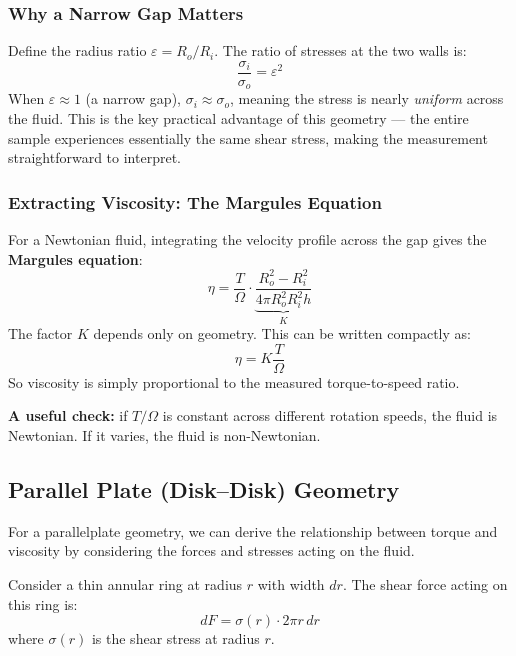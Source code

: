 \subsubsection{Why a Narrow Gap Matters}

Define the radius ratio $\varepsilon = R_o/R_i$. The ratio of stresses at the two 
walls is:
\begin{equation}
    \frac{\sigma_i}{\sigma_o} = \varepsilon^2
\end{equation}
When $\varepsilon \approx 1$ (a narrow gap), $\sigma_i \approx \sigma_o$, meaning 
the stress is nearly \emph{uniform} across the fluid. This is the key practical 
advantage of this geometry --- the entire sample experiences essentially the same 
shear stress, making the measurement straightforward to interpret.

\subsubsection{Extracting Viscosity: The Margules Equation}

For a Newtonian fluid, integrating the velocity profile across the gap gives the 
\textbf{Margules equation}:
\begin{equation}
    \eta = \frac{T}{\Omega} \cdot \underbrace{\frac{R_o^2 - R_i^2}{4\pi R_o^2 
    R_i^2 h}}_{K}
\end{equation}
The factor $K$ depends only on geometry. This can be written compactly as:
\begin{equation}
    \eta = K\frac{T}{\Omega}
\end{equation}
So viscosity is simply proportional to the measured torque-to-speed ratio. 

\textbf{A useful check:} if $T/\Omega$ is constant across different rotation 
speeds, the fluid is Newtonian. If it varies, the fluid is non-Newtonian.

\subsection{Parallel Plate (Disk--Disk) Geometry}
For a parallelplate geometry, we can derive the relationship between torque and viscosity by considering the forces and stresses acting on the fluid.

Consider a thin annular ring at radius $r$ with width $dr$. The shear force acting on this ring is:
\begin{equation}
	dF = \sigma(r) \cdot 2\pi r \, dr
\end{equation}
where $\sigma(r)$ is the shear stress at radius $r$.

